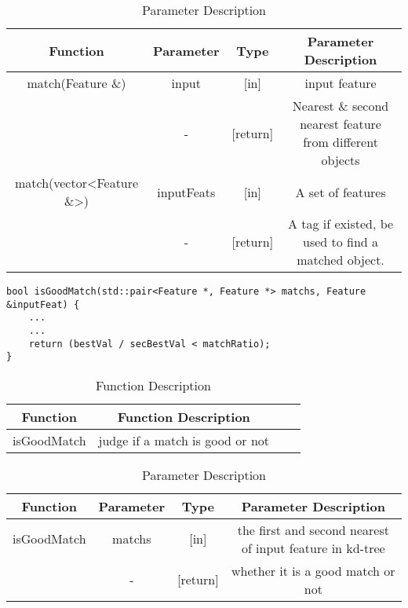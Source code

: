 \documentclass[paper=a4, fontsize=11pt]{scrartcl} %
\numberwithin{equation}{section} %
\numberwithin{figure}{section} %
\numberwithin{table}{section} %
\begin{document}
\begin{table}[h]
    \centering
    \begin{tabular}{|c|c|c|c|}
        \hline
        \textbf{Function} & \textbf{Parameter} & \textbf{Type} & \textbf{Parameter Description} \\\hline
            match(Feature \&) & input & [in] & input feature\\
                           & - & [return] & Nearest \& second nearest feature from different objects\\\hline
        match(vector<Feature \&>)& inputFeats & [in] & A set of features \\
                              & - & [return] & A tag if existed, be used to find a matched object.\\\hline
    \end{tabular}
    \caption{Parameter Description}\label{nolock}
\end{table}

\begin{lstlisting}
bool isGoodMatch(std::pair<Feature *, Feature *> matchs, Feature &inputFeat) {
    ...
    ...
    return (bestVal / secBestVal < matchRatio);
}
\end{lstlisting}

\begin{table}[H]
    \centering
    \begin{tabular}{|c|c| lp{}}
        \hline
        \textbf{Function} & \textbf{Function Description} \\\hline
    isGoodMatch  & judge if a match is good or not \\\hline
    \end{tabular}
    \caption{Function Description}\label{nolock}
\end{table}

\begin{table}[h]
    \centering
    \begin{tabular}{|c|c|c|c|}
        \hline
        \textbf{Function} & \textbf{Parameter} & \textbf{Type} & \textbf{Parameter Description} \\\hline
            isGoodMatch & matchs & [in] & the first and second nearest of input feature in kd-tree \\
             & - & [return] & whether it is a good match or not \\\hline
    \end{tabular}
    \caption{Parameter Description}\label{nolock}
\end{table}
\end{document}
